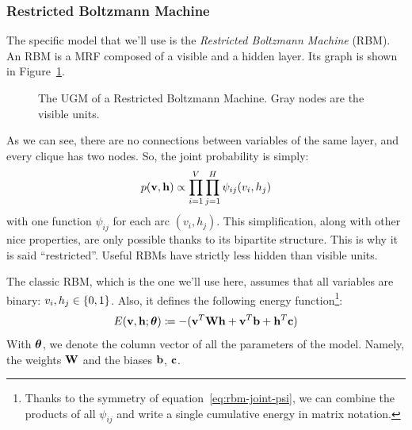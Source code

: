 \subsubsection*{Restricted Boltzmann Machine}

The specific model that we'll use is the \emph{Restricted Boltzmann Machine}
(RBM). An RBM is a MRF
composed of a visible and a hidden layer. Its graph is shown in
Figure~\ref{fig:rbm}.
\begin{figure}
	\centering
	\caption{The UGM of a Restricted Boltzmann Machine. Gray nodes are the
	visible units.}
	\label{fig:rbm}
\end{figure}
As we can see, there are no connections between variables of the same layer,
and every clique has two nodes. So, the joint probability is simply:
\begin{equation}
	p(\mathbf{v}, \mathbf{h}) \propto \prod_{i=1}^{V} \prod_{j=1}^{H} \psi_{ij}(v_i, h_j)
	\label{eq:rbm-joint-psi}
\end{equation}
with one function $\psi_{ij}$ for each arc $(v_i, h_j)$. This simplification,
along with other nice properties, are only possible thanks to its bipartite
structure. This is why it is said ``restricted''. Useful RBMs have strictly
less hidden than visible units.

The classic RBM, which is the one we'll use here, assumes that all variables
are binary: $v_i, h_j \in \{0,1\}$. Also, it defines the following energy
function\footnote{Thanks to the symmetry of equation~\eqref{eq:rbm-joint-psi},
we can combine the products of all $\psi_{ij}$ and write a single cumulative
energy in matrix notation.}:
\begin{equation}
	E(\mathbf{v},\mathbf{h}; \bm{\theta}) \coloneqq -( \mathbf{v}^T \mathbf{W} \mathbf{h} + \mathbf{v}^T \mathbf{b} +
	\mathbf{h}^T \mathbf{c})
	\label{eq:rbm-energy}
\end{equation}
With $\bm{\theta}$, we denote the column vector of all the parameters of the
model. Namely, the weights $\mathbf{W}$ and the biases $\mathbf{b}$, $\mathbf{c}$.

